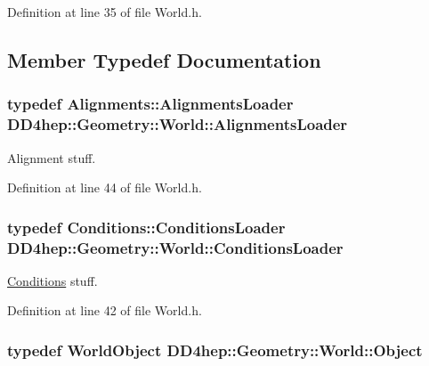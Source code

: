 Definition at line 35 of file World.h.

\subsection{Member Typedef Documentation}
\hypertarget{class_d_d4hep_1_1_geometry_1_1_world_a4756d57ac9e7f6d43056b07dfbfe6904}{
\subsubsection[{AlignmentsLoader}]{\setlength{\rightskip}{0pt plus 5cm}typedef {\bf Alignments::AlignmentsLoader} {\bf DD4hep::Geometry::World::AlignmentsLoader}}}
\label{class_d_d4hep_1_1_geometry_1_1_world_a4756d57ac9e7f6d43056b07dfbfe6904}


Alignment stuff. 

Definition at line 44 of file World.h.\hypertarget{class_d_d4hep_1_1_geometry_1_1_world_aadddae79d9d6be44141befbbb4b7337b}{
\subsubsection[{ConditionsLoader}]{\setlength{\rightskip}{0pt plus 5cm}typedef {\bf Conditions::ConditionsLoader} {\bf DD4hep::Geometry::World::ConditionsLoader}}}
\label{class_d_d4hep_1_1_geometry_1_1_world_aadddae79d9d6be44141befbbb4b7337b}


\hyperlink{namespace_d_d4hep_1_1_conditions}{Conditions} stuff. 

Definition at line 42 of file World.h.\hypertarget{class_d_d4hep_1_1_geometry_1_1_world_ade4542483ec578548cb266880f67e329}{
\subsubsection[{Object}]{\setlength{\rightskip}{0pt plus 5cm}typedef {\bf WorldObject} {\bf DD4hep::Geometry::World::Object}}}
\label{class_d_d4hep_1_1_geometry_1_1_world_ade4542483ec578548cb266880f67e329}


